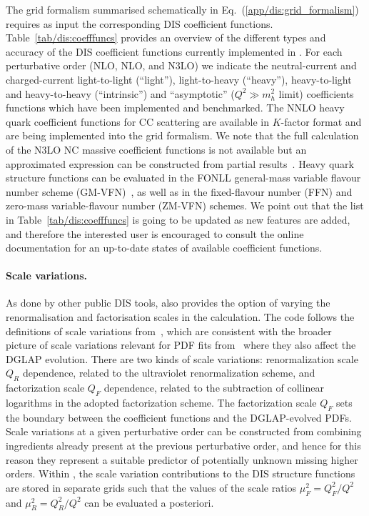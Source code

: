 The grid formalism summarised schematically in
Eq.~(\ref{app/dis:grid_formalism}) requires as input the corresponding DIS
coefficient functions.
%
Table~\ref{tab/dis:coefffuncs} provides an overview of the different types and
accuracy of the DIS coefficient functions currently implemented in \yadism.
%
For each perturbative order (NLO, NLO, and N3LO) we indicate  the
neutral-current and charged-current light-to-light (``light''), light-to-heavy
(``heavy''), heavy-to-light and heavy-to-heavy (``intrinsic'') and
``asymptotic'' ($Q^2 \gg m_h^2$ limit)  coefficients functions which have been
implemented and benchmarked.
%
The NNLO heavy quark coefficient functions for CC scattering are available in
$K$-factor format and are being implemented into the \yadism grid formalism.
%
We note that the full calculation of the N3LO NC massive coefficient functions
is not available but an approximated expression can be constructed from partial
results~\cite{niccolo}.
%
Heavy quark structure functions can be evaluated in the FONLL general-mass
variable flavour number scheme (GM-VFN)~\cite{Forte:2010ta}, as well as in the
fixed-flavour number (FFN) and zero-mass variable-flavour number (ZM-VFN)
schemes.
%
We point out that the list in Table~\ref{tab/dis:coefffuncs} is going to be
updated as new features are added, and therefore the interested user is
encouraged to consult the online documentation for an up-to-date states of
available coefficient functions.



\paragraph{Scale variations.}
%
As done by other public DIS tools, \yadism also provides the option of varying
the renormalisation and factorisation scales in the calculation.
%
The code follows the definitions of scale variations
from~\cite{vanNeerven:2000uj,vanNeerven:2001pe}, which are consistent with the
broader picture of scale variations relevant for PDF fits
from~\cite{NNPDF:2019ubu} where they also affect the DGLAP evolution.
%
There are two kinds of scale variations: renormalization scale $Q_R$
dependence, related to the ultraviolet renormalization scheme, and
factorization scale $Q_F$ dependence, related to the subtraction of collinear
logarithms in the adopted factorization scheme.
%
The factorization scale $Q_F$ sets  the boundary between the coefficient
functions and the DGLAP-evolved PDFs.
%
Scale variations at a given perturbative order can be constructed from
combining ingredients already present at the previous perturbative order, and
hence for this reason they represent a suitable predictor of potentially
unknown missing higher orders.
%
Within \yadism, the scale variation contributions to the DIS structure
functions are stored in separate grids such that the values of the scale ratios
$\mu_F^2=Q_F^2/Q^2$ and $\mu_R^2=Q_R^2/Q^2$ can be evaluated a posteriori.

